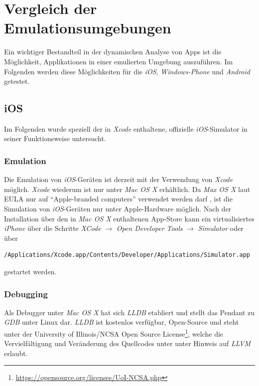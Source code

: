 \newpage
\section{Vergleich der Emulationsumgebungen}\label{ref:VerglAktSitEmu}
Ein wichtiger Bestandteil in der dynamischen Analyse von Apps ist die Möglichkeit, Applikationen in einer emulierten Umgebung auszuführen. Im Folgenden werden diese Möglichkeiten für die \textit{iOS}, \textit{Windows-Phone} und \textit{Android} getestet.
 
	\subsection{iOS}
	Im Folgenden wurde speziell der in \textit{Xcode} enthaltene, offizielle \textit{iOS}-Simulator in seiner Funktionsweise untersucht.
	
			\subsubsection{Emulation}\label{ref:emulation}
			Die Emulation von \textit{iOS}-Geräten ist derzeit mit der Verwendung von \textit{Xcode} möglich. \textit{Xcode} wiederum ist nur unter \textit{Mac OS X} erhältlich. Da \textit{Max OS X} laut EULA nur auf "`Apple-branded computers"' verwendet werden darf \cite{AppleEULA}, ist die Simulation von \textit{iOS}-Geräten nur unter Apple-Hardware möglich. Nach der Installation über den in \textit{Mac OS X} enthaltenen App-Store kann ein virtualisiertes \textit{iPhone} über die Schritte \textit{XCode} $\rightarrow$ \textit{Open Developer Tools} $\rightarrow$ \textit{Simulator} oder über 
\begin{lstlisting}
/Applications/Xcode.app/Contents/Developer/Applications/Simulator.app
\end{lstlisting}			
gestartet werden.\\
			
		\subsubsection{Debugging}
Als Debugger unter \textit{Mac OS X} hat sich \textit{LLDB} etabliert und stellt das Pendant zu \textit{GDB} unter Linux dar. \textit{LLDB} ist kostenlos verfügbar, Open-Source und steht unter der University of Illinois/NCSA Open Source License\footnote{\url{https://opensource.org/licenses/UoI-NCSA.php}}, welche die Vervielfältigung und Veränderung des Quellcodes unter unter Hinweis auf \textit{LLVM} erlaubt.\\

